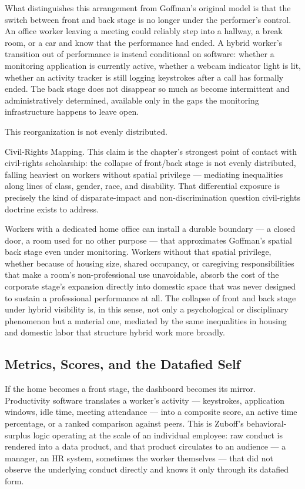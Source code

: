\documentclass[12pt]{article}
\begin{document}
What distinguishes this arrangement from Goffman's original model is that the switch between front and back stage is no longer under the performer's control. An office worker leaving a meeting could reliably step into a hallway, a break room, or a car and know that the performance had ended. A hybrid worker's transition out of performance is instead conditional on software: whether a monitoring application is currently active, whether a webcam indicator light is lit, whether an activity tracker is still logging keystrokes after a call has formally ended. The back stage does not disappear so much as become intermittent and administratively determined, available only in the gaps the monitoring infrastructure happens to leave open.

This reorganization is not evenly distributed.

\begin{callout}{Civil-Rights Mapping.}
This claim is the chapter's strongest point of contact with civil-rights scholarship: the collapse of front/back stage is not evenly distributed, falling heaviest on workers without spatial privilege --- mediating inequalities along lines of class, gender, race, and disability. That differential exposure is precisely the kind of disparate-impact and non-discrimination question civil-rights doctrine exists to address.
\end{callout}

Workers with a dedicated home office can install a durable boundary --- a closed door, a room used for no other purpose --- that approximates Goffman's spatial back stage even under monitoring. Workers without that spatial privilege, whether because of housing size, shared occupancy, or caregiving responsibilities that make a room's non-professional use unavoidable, absorb the cost of the corporate stage's expansion directly into domestic space that was never designed to sustain a professional performance at all. The collapse of front and back stage under hybrid visibility is, in this sense, not only a psychological or disciplinary phenomenon but a material one, mediated by the same inequalities in housing and domestic labor that structure hybrid work more broadly.

\subsection{Metrics, Scores, and the Datafied Self}

If the home becomes a front stage, the dashboard becomes its mirror. Productivity software translates a worker's activity --- keystrokes, application windows, idle time, meeting attendance --- into a composite score, an active time percentage, or a ranked comparison against peers. This is Zuboff's behavioral-surplus logic operating at the scale of an individual employee: raw conduct is rendered into a data product, and that product circulates to an audience --- a manager, an HR system, sometimes the worker themselves --- that did not observe the underlying conduct directly and knows it only through its datafied form.
\end{document}
